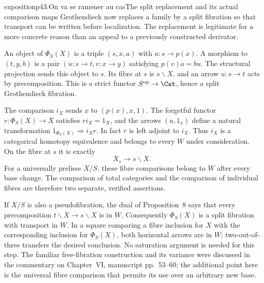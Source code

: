 \begin{dcomment}{exposition}{p43:On va se ramener au cas}{The split replacement and its actual comparison maps}
Grothendieck now replaces a family by a split fibration so that transport can be written before localization. The replacement is legitimate for a more concrete reason than an appeal to a previously constructed derivator.

An object of $\Phi_S(X)$ is a triple $(s,x,a)$ with $a:s\to p(x)$. A morphism to $(t,y,b)$ is a pair $(u:s\to t,v:x\to y)$ satisfying $p(v)a=bu$. The structural projection sends this object to $s$. Its fibre at $s$ is $s\backslash X$, and an arrow $u:s\to t$ acts by precomposition. This is a strict functor $S^{\mathrm{op}}\to\Cat$, hence a split Grothendieck fibration.

The comparison $i_X$ sends $x$ to $(p(x),x,1)$. The forgetful functor $r:\Phi_S(X)\to X$ satisfies $ri_X=1_X$, and the arrows $(a,1_x)$ define a natural transformation $1_{\Phi_S(X)}\Rightarrow i_Xr$. In fact $r$ is left adjoint to $i_X$. Thus $i_X$ is a categorical homotopy equivalence and belongs to every $W$ under consideration. On the fibre at $s$ it is exactly
\[
 X_s\longrightarrow s\backslash X.
\]
For a universally prelisse $X/S$, these fibre comparisons belong to $W$ after every base change. The comparison of total categories and the comparison of individual fibres are therefore two separate, verified assertions.

If $X/S$ is also a pseudofibration, the dual of Proposition~8 says that every precomposition $t\backslash X\to s\backslash X$ is in $W$. Consequently $\Phi_S(X)$ is a split fibration with transport in $W$. In a square comparing a fibre inclusion for $X$ with the corresponding inclusion for $\Phi_S(X)$, both horizontal arrows are in $W$; two-out-of-three transfers the desired conclusion. No saturation argument is needed for this step. The familiar free-fibration construction and its variance were discussed in the commentary on Chapter~VI, manuscript pp.~53--60; the additional point here is the universal fibre comparison that permits its use over an arbitrary new base.
\end{dcomment}

